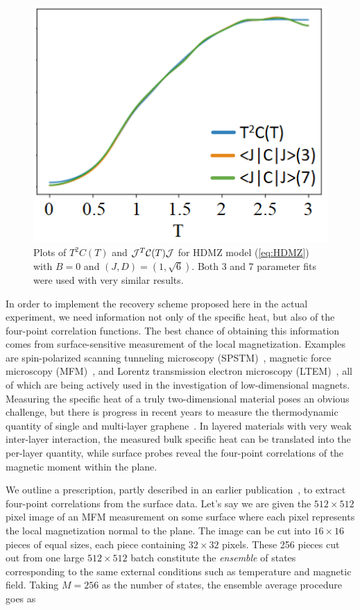 \documentclass[reprint,amsmath,amssymb,aps,showpacs,superscriptaddress,prb]{revtex4-1}
\begin{document}
\begin{figure}
  \centering
\includegraphics[scale=0.5]{fig3.png}
\caption{Plots of $T^2 C(T)$ and ${\cal J}^T {\cal C}(T) {\cal J}$ for HDMZ model (\ref{eq:HDMZ}) with $B=0$ and $(J,D)=(1,\sqrt{6})$. Both 3 and 7 parameter fits were used with very similar results. }\label{fig:3}
\end{figure}

In order to implement the recovery scheme proposed here in the actual experiment, we need information not only of the specific heat, but also of the four-point correlation functions. The best chance of obtaining this information comes from surface-sensitive measurement of the local magnetization. Examples are spin-polarized scanning tunneling microscopy (SPSTM)~\cite{SPSTM}, magnetic force microscopy (MFM)~\cite{MFM}, and Lorentz transmission electron microscopy (LTEM)~\cite{LTEM}, all of which are being actively used in the investigation of low-dimensional magnets. Measuring the specific heat of a truly two-dimensional material poses an obvious challenge, but there is progress in recent years to measure the thermodynamic quantity of single and multi-layer graphene~\cite{2D-specific-heat}. In layered materials with very weak inter-layer interaction, the measured bulk specific heat can be translated into the per-layer quantity, while surface probes reveal the four-point correlations of the magnetic moment within the plane.

We outline a prescription, partly described in an earlier publication~\cite{kumar18}, to extract four-point correlations from the surface data. Let's say we are given the $512\times 512$ pixel image of an MFM measurement on some surface where each pixel represents the local magnetization normal to the plane. The image can be cut into $16\times16$ pieces of equal sizes, each piece containing $32\times32$ pixels. These 256 pieces cut out from one large $512\times512$ batch constitute the {\it ensemble} of states corresponding to the same external conditions such as temperature and magnetic field. Taking $M=256$ as the number of states, the ensemble average procedure goes as
\end{document}
